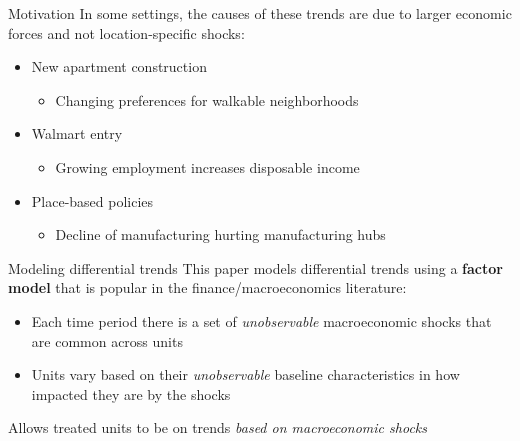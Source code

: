 \documentclass[aspectratio=169,t,11pt]{beamer}
\begin{document}
\begin{frame}{Motivation}
  In some settings, the causes of these trends are due to larger economic forces and not location-specific shocks:
  
  \begin{itemize}
    \item New apartment construction
    \begin{itemize}
      \item Changing preferences for walkable neighborhoods
    \end{itemize} 

    \pause
    \item Walmart entry
    \begin{itemize}
      \item Growing employment increases disposable income
    \end{itemize}

    \pause
    \item Place-based policies
    \begin{itemize}
      \item Decline of manufacturing hurting manufacturing hubs
    \end{itemize}
  \end{itemize}
\end{frame}

\begin{frame}{Modeling differential trends}
  This paper models differential trends using a \textbf{factor model} that is popular in the finance/macroeconomics literature:

  \begin{itemize}
    \item Each time period there is a set of \emph{unobservable} macroeconomic shocks that are common across units
    \item Units vary based on their \emph{unobservable} baseline characteristics in how impacted they are by the shocks
  \end{itemize} 

  \pause
  \bigskip
  Allows treated units to be on trends \emph{based on macroeconomic shocks}
\end{frame}

% 
\end{document}
